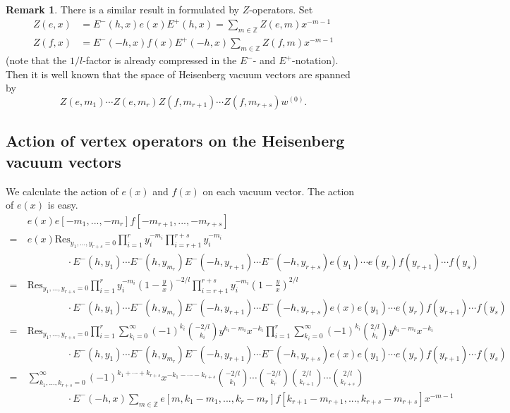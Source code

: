 \documentclass[11pt,oneside,reqno]{amsart}
\theoremstyle{definition}
\newtheorem{rema}[theorem]{Remark}
\newcommand{\Z}{{\mathbb Z}}
\newcommand{\Res}{\text{Res}}
\begin{document}
\begin{rema}
    There is a similar result in \cite{Li-Abel-Coset} formulated by $Z$-operators. 
    Set     
    \begin{align*}
        Z(e,x) &= E^-(h, x) e(x) E^+(h, x) = \sum_{m\in \Z} Z(e, m)x^{-m-1}\\
        Z(f,x) &= E^-(-h, x) f(x) E^+(-h, x) \sum_{m\in \Z} Z(f, m)x^{-m-1}
    \end{align*}
    (note that the $1/l$-factor is already compressed in the $E^-$- and $E^+$-notation). Then it is well known that the space of Heisenberg vacuum vectors are spanned by 
    $$Z(e, m_1) \cdots Z(e, m_r) Z(f, m_{r+1}) \cdots Z(f, m_{r+s})w^{(0)}.$$
\end{rema}

\subsection{Action of vertex operators on the Heisenberg vacuum vectors} We calculate the action of $e(x)$ and $f(x)$ on each vacuum vector. The action of $e(x)$ is easy.
\begin{align*}
    & e(x) e[-m_1, ..., -m_r]f[-m_{r+1}, ..., -m_{r+s}] \\
    = \ & e(x) \Res_{y_1, ...,  y_{r+s} = 0} \prod_{i=1}^r y_i^{-m_i} \prod_{i=r+1}^{r+s} y_i^{-m_i} \\
    & \qquad \qquad \cdot E^-(h, y_1) \cdots E^-(h, y_{m_r}) E^-(-h, y_{r+1}) \cdots E^-(-h, y_{r+s})e(y_1) \cdots e(y_r) f(y_{r+1}) \cdots f(y_s)\\
    = \ & \Res_{y_1, ...,  y_{r+s} = 0} \prod_{i=1}^{r}y_i^{-m_i} \left(1-\frac y x\right)^{-2/l} \prod_{i=r+1}^{r+s}y_i^{-m_i} \left(1-\frac y x\right)^{2/l} \\
    & \qquad \qquad \cdot E^-(h, y_1) \cdots E^-(h, y_{m_r}) E^-(-h, y_{r+1}) \cdots E^-(-h, y_{r+s})e(x)e(y_1) \cdots e(y_r) f(y_{r+1}) \cdots f(y_s)\\
    = \ & \Res_{y_1, ...,  y_{r+s} = 0} \prod_{i=1}^{r}\sum_{k_i=0}^\infty (-1)^{k_i} \binom{-2/l}{k_i} y^{k_i-m_i}x^{-k_i} \prod_{i=1}^{r}\sum_{k_i=0}^\infty (-1)^{k_i} \binom{2/l}{k_i} y^{k_i-m_i}x^{-k_i}  \\
    & \qquad \qquad \cdot E^-(h, y_1) \cdots E^-(h, y_{m_r}) E^-(-h, y_{r+1}) \cdots E^-(-h, y_{r+s})e(x)e(y_1) \cdots e(y_r) f(y_{r+1}) \cdots f(y_s)\\
    = \ & \sum_{k_1, ..., k_{r+s} = 0}^\infty (-1)^{k_1+\cdots + k_{r+s}} x^{-k_1-\cdots -k_{r+s}} \binom{-2/l}{k_1}\cdots \binom{-2/l}{k_r} \binom{2/l}{k_{r+1}}\cdots \binom{2/l}{k_{r+s}} \\
    & \qquad \qquad \cdot E^-(-h, x) \sum_{m\in \Z} e[m, k_1-m_1, ..., k_r-m_r]f[k_{r+1}-m_{r+1}, ..., k_{r+s}-m_{r+s}] x^{-m-1}
\end{align*}
\end{document}
